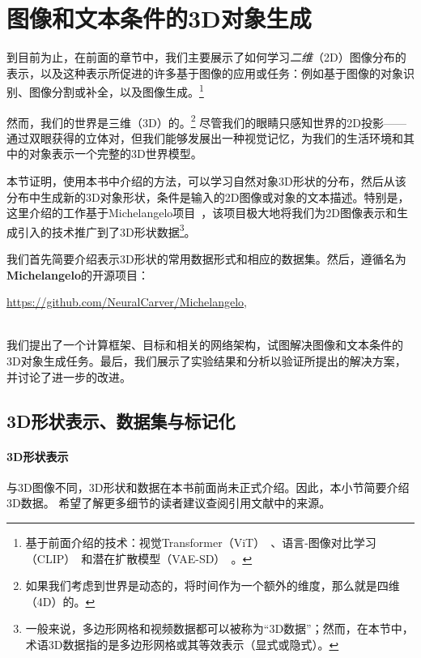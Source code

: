 \documentclass[../../book-main_zh.tex]{subfiles}
\begin{document}
\section{图像和文本条件的3D对象生成}
\label{sec:Michelangelo}\label{sec:object-generation}

到目前为止，在前面的章节中，我们主要展示了如何学习{\em 二维}（2D）图像分布的表示，以及这种表示所促进的许多基于图像的应用或任务：例如基于图像的对象识别、图像分割或补全，以及图像生成。\footnote{基于前面介绍的技术：视觉Transformer（ViT）~\cite{NIPS2017_3f5ee243}、语言-图像对比学习（CLIP）~\cite{pmlr-v139-radford21a}和潜在扩散模型（VAE-SD）~\cite{rombach2022high}。}

然而，我们的世界是三维（3D）的。\footnote{如果我们考虑到世界是动态的，将时间作为一个额外的维度，那么就是四维（4D）的。} 尽管我们的眼睛只感知世界的2D投影——通过双眼获得的立体对，但我们能够发展出一种视觉记忆，为我们的生活环境和其中的对象表示一个完整的3D世界模型。

本节证明，使用本书中介绍的方法，可以学习自然对象3D形状的分布，然后从该分布中生成新的3D对象形状，条件是输入的2D图像或对象的文本描述。特别是，这里介绍的工作基于Michelangelo项目~\cite{NEURIPS2023_ea1a7f7b}，该项目极大地将我们为2D图像表示和生成引入的技术推广到了3D形状数据\footnote{一般来说，多边形网格和视频数据都可以被称为“3D数据”；然而，在本节中，术语3D数据指的是多边形网格或其等效表示（显式或隐式）。}。

我们首先简要介绍表示3D形状的常用数据形式和相应的数据集。然后，遵循名为\textbf{Michelangelo}的开源项目\cite{NEURIPS2023_ea1a7f7b}：\\
\centerline{\url{https://github.com/NeuralCarver/Michelangelo},}\\
我们提出了一个计算框架、目标和相关的网络架构，试图解决图像和文本条件的3D对象生成任务。最后，我们展示了实验结果和分析以验证所提出的解决方案，并讨论了进一步的改进。

\subsection{3D形状表示、数据集与标记化}

\paragraph{3D形状表示}
\label{sec:3D representation}
与3D图像不同，3D形状和数据在本书前面尚未正式介绍。因此，本小节简要介绍3D数据。
希望了解更多细节的读者建议查阅引用文献中的来源。
\end{document}
